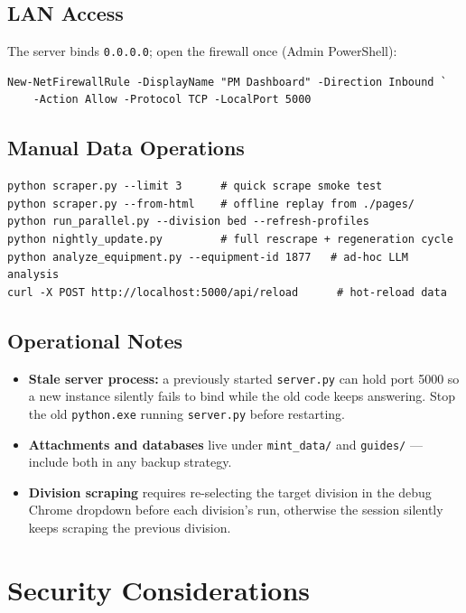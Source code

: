 \documentclass[11pt,a4paper]{article}
\newcommand{\code}[1]{\texttt{#1}}
\begin{document}
\subsection{LAN Access}
The server binds \code{0.0.0.0}; open the firewall once (Admin PowerShell):
\begin{lstlisting}
New-NetFirewallRule -DisplayName "PM Dashboard" -Direction Inbound `
    -Action Allow -Protocol TCP -LocalPort 5000
\end{lstlisting}

\subsection{Manual Data Operations}
\begin{lstlisting}
python scraper.py --limit 3      # quick scrape smoke test
python scraper.py --from-html    # offline replay from ./pages/
python run_parallel.py --division bed --refresh-profiles
python nightly_update.py         # full rescrape + regeneration cycle
python analyze_equipment.py --equipment-id 1877   # ad-hoc LLM analysis
curl -X POST http://localhost:5000/api/reload      # hot-reload data
\end{lstlisting}

\subsection{Operational Notes}
\begin{itemize}
    \item \textbf{Stale server process:} a previously started
          \code{server.py} can hold port 5000 so a new instance silently
          fails to bind while the old code keeps answering. Stop the old
          \code{python.exe} running \code{server.py} before restarting.
    \item \textbf{Attachments and databases} live under \code{mint\_data/}
          and \code{guides/} --- include both in any backup strategy.
    \item \textbf{Division scraping} requires re-selecting the target
          division in the debug Chrome dropdown before each division's
          run, otherwise the session silently keeps scraping the previous
          division.
\end{itemize}

\section{Security Considerations}
\end{document}
